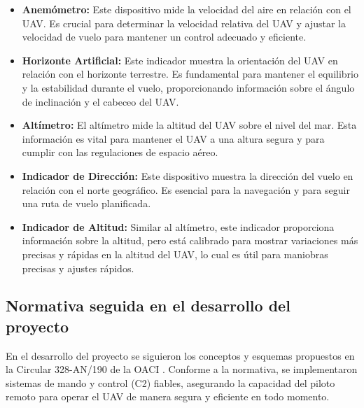         \begin{itemize}
            \item \textbf{Anemómetro:} Este dispositivo mide la velocidad del aire en relación con el UAV. Es crucial para determinar la velocidad relativa del UAV y ajustar la velocidad de vuelo para mantener un control adecuado y eficiente.\vspace{5 px}

            \item \textbf{Horizonte Artificial:} Este indicador muestra la orientación del UAV en relación con el horizonte terrestre. Es fundamental para mantener el equilibrio y la estabilidad durante el vuelo, proporcionando información sobre el ángulo de inclinación y el cabeceo del UAV.\vspace{5 px}

            \item \textbf{Altímetro:} El altímetro mide la altitud del UAV sobre el nivel del mar. Esta información es vital para mantener el UAV a una altura segura y para cumplir con las regulaciones de espacio aéreo.\vspace{5 px}

            \item \textbf{Indicador de Dirección:} Este dispositivo muestra la dirección del vuelo en relación con el norte geográfico. Es esencial para la navegación y para seguir una ruta de vuelo planificada.\vspace{5 px}

            \item \textbf{Indicador de Altitud:} Similar al altímetro, este indicador proporciona información sobre la altitud, pero está calibrado para mostrar variaciones más precisas y rápidas en la altitud del UAV, lo cual es útil para maniobras precisas y ajustes rápidos.\vspace{5 px}
        \end{itemize}

    \subsection{Normativa seguida en el desarrollo del proyecto}

        En el desarrollo del proyecto se siguieron los conceptos y esquemas propuestos en la Circular 328-AN/190 de la OACI \cite{circular_aerea}. Conforme a la normativa, se implementaron sistemas de mando y control (C2) fiables, asegurando la capacidad del piloto remoto para operar el UAV de manera segura y eficiente en todo momento.\vspace{5 px}

